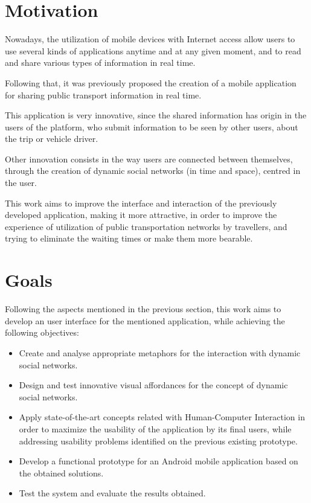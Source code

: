 \documentclass[9pt,a4paper]{extarticle}
\begin{document}
\begin{multicols}{2}

\section{Motivation}\label{sec:motiva}

Nowadays, the utilization of mobile devices with Internet access allow users to use several kinds of applications anytime and at any given moment, and to read and share various types of information in real time.

Following that, it was previously proposed the creation of a mobile application for sharing public transport information in real time. 

This application is very innovative, since the shared information has origin in the users of the platform, who submit information to be seen by other users, about the trip or vehicle driver.

Other innovation consists in the way users are connected between themselves, through the creation of dynamic social networks (in time and space), centred in the user.

This work aims to improve the interface and interaction of the previously developed application, making it more attractive, in order to improve the experience of utilization of public transportation networks by travellers, and trying to eliminate the waiting times or make them more bearable.

\section{Goals}\label{sec:goals}

Following the aspects mentioned in the previous section, this work aims to develop an user interface for the mentioned application, while achieving the following objectives:

\begin{itemize}
\item Create and analyse appropriate metaphors for the interaction with dynamic social networks.
\item Design and test innovative visual affordances for the concept of dynamic social networks.
\item Apply state-of-the-art concepts related with Human-Computer Interaction in order to maximize the usability of the application by its final users, while addressing usability problems identified on the previous existing prototype.
\item Develop a functional prototype for an Android mobile application based on the obtained solutions.
\item Test the system and evaluate the results obtained. 
\end{itemize}


\end{multicols}
\end{document}
